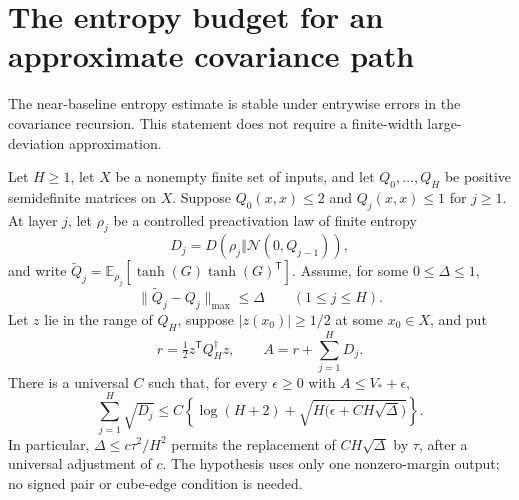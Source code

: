 \section{The entropy budget for an approximate covariance path}
\label{sec:critical-approximate-entropy}

The near-baseline entropy estimate is stable under entrywise errors
in the covariance recursion. This statement does not require a
finite-width large-deviation approximation.

\begin{lemma}
\label{lem:critical-approximate-entropy-budget}
Let $H\ge1$, let $X$ be a nonempty finite set of inputs, and let
$Q_0,\ldots,Q_H$ be positive semidefinite matrices on $X$.
Suppose $Q_0(x,x)\le2$ and $Q_j(x,x)\le1$ for $j\ge1$.
At layer $j$, let $\rho_j$ be a controlled preactivation law of
finite entropy
\[
 D_j=D(\rho_j\Vert\mathcal N(0,Q_{j-1})),
\]
and write
$\widetilde Q_j=\mathbb E_{\rho_j}[\tanh(G)\tanh(G)^{\mathsf T}]$.
Assume, for some $0\le\Delta\le1$,
\[
 \|\widetilde Q_j-Q_j\|_{\max}\le\Delta
                    \qquad(1\le j\le H).
\]
Let $z$ lie in the range of $Q_H$, suppose
$|z(x_0)|\ge1/2$ at some $x_0\in X$, and put
\[
 r=\tfrac12 z^{\mathsf T}Q_H^\dagger z,\qquad
 A=r+\sum_{j=1}^H D_j.
\]
There is a universal $C$ such that, for every $\epsilon\ge0$ with
$A\le V_*+\epsilon$,
\[
 \sum_{j=1}^H\sqrt{D_j}
 \le C\left\{\log(H+2)+
       \sqrt{H\bigl(\epsilon+CH\sqrt\Delta\bigr)}\right\}.
\]
In particular, $\Delta\le c\tau^2/H^2$ permits the replacement of
$CH\sqrt\Delta$ by $\tau$, after a universal adjustment of $c$.
The hypothesis uses only one nonzero-margin output; no signed pair
or cube-edge condition is needed.
\end{lemma}

